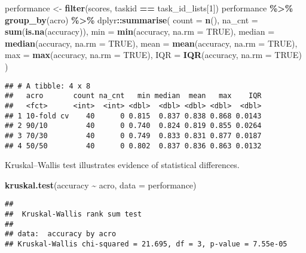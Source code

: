 \documentclass[
]{book}
\newenvironment{Shaded}{\begin{snugshade}}{\end{snugshade}}
\newcommand{\AttributeTok}[1]{\textcolor[rgb]{0.13,0.29,0.53}{#1}}
\newcommand{\ConstantTok}[1]{\textcolor[rgb]{0.56,0.35,0.01}{#1}}
\newcommand{\DecValTok}[1]{\textcolor[rgb]{0.00,0.00,0.81}{#1}}
\newcommand{\FunctionTok}[1]{\textcolor[rgb]{0.13,0.29,0.53}{\textbf{#1}}}
\newcommand{\NormalTok}[1]{#1}
\newcommand{\OtherTok}[1]{\textcolor[rgb]{0.56,0.35,0.01}{#1}}
\newcommand{\SpecialCharTok}[1]{\textcolor[rgb]{0.81,0.36,0.00}{\textbf{#1}}}
\begin{document}
\begin{Shaded}
\begin{Highlighting}[]
\NormalTok{performance }\OtherTok{\textless{}{-}} \FunctionTok{filter}\NormalTok{(scores, taskid }\SpecialCharTok{==}\NormalTok{ task\_id\_lists[}\DecValTok{1}\NormalTok{])}
\NormalTok{performance }\SpecialCharTok{\%\textgreater{}\%}
  \FunctionTok{group\_by}\NormalTok{(acro) }\SpecialCharTok{\%\textgreater{}\%}
\NormalTok{  dplyr}\SpecialCharTok{::}\FunctionTok{summarise}\NormalTok{(}
    \AttributeTok{count =} \FunctionTok{n}\NormalTok{(),}
    \AttributeTok{na\_cnt =} \FunctionTok{sum}\NormalTok{(}\FunctionTok{is.na}\NormalTok{(accuracy)),}
    \AttributeTok{min =} \FunctionTok{min}\NormalTok{(accuracy, }\AttributeTok{na.rm =} \ConstantTok{TRUE}\NormalTok{),}
    \AttributeTok{median =} \FunctionTok{median}\NormalTok{(accuracy, }\AttributeTok{na.rm =} \ConstantTok{TRUE}\NormalTok{),}
    \AttributeTok{mean =} \FunctionTok{mean}\NormalTok{(accuracy, }\AttributeTok{na.rm =} \ConstantTok{TRUE}\NormalTok{),}
    \AttributeTok{max =} \FunctionTok{max}\NormalTok{(accuracy, }\AttributeTok{na.rm =} \ConstantTok{TRUE}\NormalTok{),}
    \AttributeTok{IQR =} \FunctionTok{IQR}\NormalTok{(accuracy, }\AttributeTok{na.rm =} \ConstantTok{TRUE}\NormalTok{)}
\NormalTok{  )}
\end{Highlighting}
\end{Shaded}

\begin{verbatim}
## # A tibble: 4 x 8
##   acro       count na_cnt   min median  mean   max    IQR
##   <fct>      <int>  <int> <dbl>  <dbl> <dbl> <dbl>  <dbl>
## 1 10-fold cv    40      0 0.815  0.837 0.838 0.868 0.0143
## 2 90/10         40      0 0.740  0.824 0.819 0.855 0.0264
## 3 70/30         40      0 0.749  0.833 0.831 0.877 0.0187
## 4 50/50         40      0 0.802  0.837 0.836 0.863 0.0132
\end{verbatim}

Kruskal--Wallis test illustrates evidence of statistical differences.

\begin{Shaded}
\begin{Highlighting}[]
\FunctionTok{kruskal.test}\NormalTok{(accuracy }\SpecialCharTok{\textasciitilde{}}\NormalTok{ acro, }\AttributeTok{data =}\NormalTok{ performance)}
\end{Highlighting}
\end{Shaded}

\begin{verbatim}
## 
##  Kruskal-Wallis rank sum test
## 
## data:  accuracy by acro
## Kruskal-Wallis chi-squared = 21.695, df = 3, p-value = 7.55e-05
\end{verbatim}
\end{document}
